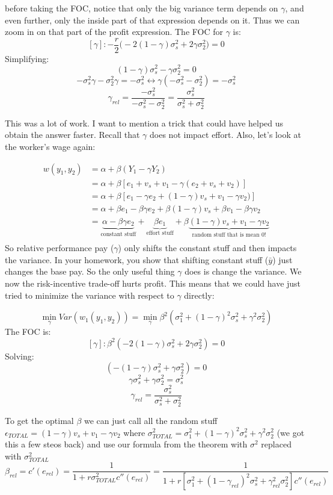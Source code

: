 \documentclass{article}
\begin{document}
before taking the FOC, notice that only the big variance term depends on $\gamma$, and even further, only the inside part of that expression depends on it. Thus we can zoom in on that part of the profit expression. The FOC for $\gamma$ is:
\[[\gamma]: -\frac{r}{2} \bigg ( -2(1-\gamma) \sigma^2_s + 2\gamma \sigma_2^2 \bigg )=0 \]
Simplifying:
\[  (1-\gamma) \sigma^2_s - \gamma \sigma_2^2 =0 \]
\[  -\sigma^2_s\gamma  - \sigma_2^2\gamma  =-\sigma^2_s \leftrightarrow \gamma (-\sigma^2_s -\sigma_2^2)= -\sigma^2_s\]
\[ \gamma_{rel}= \frac{-\sigma^2_s}{-\sigma^2_s-\sigma_2^2}= \frac{\sigma^2_s}{\sigma^2_s+\sigma_2^2}\]

This was a lot of work. I want to mention a trick that could have helped us obtain the answer faster. Recall that $\gamma$ does not impact effort. Also, let's look at the worker's wage again:

\begin{align*}
    w(y_1, y_2)&=\alpha + \beta (Y_1 - \gamma Y_2)\\
    &= \alpha + \beta [e_1+v_s + v_1 - \gamma (e_2+v_s + v_2)]\\
    &= \alpha + \beta [e_1- \gamma e_2 +(1-\gamma)v_s + v_1 -\gamma v_2)]\\
    &= \alpha + \beta e_1- \beta \gamma e_2 +\beta (1-\gamma)v_s + \beta v_1 -\beta \gamma v_2\\
    &= \underbrace{\alpha - \beta \gamma e_2}_{\text{constant stuff}}+ \underbrace{\beta e_1}_{\text{effort stuff}} +\beta\underbrace{ (1-\gamma)v_s + v_1 - \gamma v_2}_{\text{random stuff that is mean 0!}}\\
\end{align*}
So relative performance pay ($\gamma$) only shifts the constant stuff and then impacts the variance. In your homework, you show that shifting constant stuff ($\bar y$) just changes the base pay. So the only useful thing $\gamma$ does is change the variance. We now the risk-incentive trade-off hurts profit. This means that we could have just tried to minimize the variance with respect to $\gamma$ directly:

\[\min_{\gamma} Var(w_1(y_1, y_2))=\min_{\gamma}\beta^2 ( \sigma_1^2+ (1-\gamma)^2\sigma_s^2 +\gamma^2 \sigma_2^2 )\]
The FOC is:
\[[\gamma]: \beta^2 (-2(1-\gamma)\sigma_s^2 +2\gamma \sigma_2^2 )=0\]
Solving:
\[ (-(1-\gamma)\sigma_s^2 +\gamma \sigma_2^2 )=0\]
\[ \gamma\sigma_s^2 +\gamma \sigma_2^2 =\sigma_s^2\]
\[\gamma_{rel} = \frac{\sigma_s^2}{\sigma_s^2+\sigma_2^2}\]

To get the optimal $\beta$ we can just call all the random stuff $\epsilon_{TOTAL}= (1-\gamma)v_s + v_1 - \gamma v_2$ where $\sigma^2_{TOTAL}=\sigma_1^2+ (1-\gamma)^2\sigma_s^2 +\gamma^2 \sigma_2^2$ (we got this a few steos back) and use our formula from the theorem with $\sigma^2$ replaced with $\sigma^2_{TOTAL}$
\[\beta_{rel}=c'(e_{rel})= \frac{1}{1+r \sigma^2_{TOTAL} c''(e_{rel})}=\frac{1}{1+r [\sigma_1^2+ (1-\gamma_{rel})^2\sigma_s^2 +\gamma_{rel}^2 \sigma_2^2]c''(e_{rel})}\]
\end{document}
